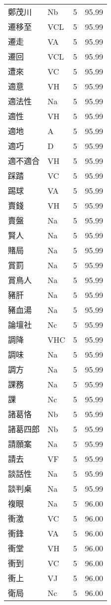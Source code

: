 \documentclass[twocolumn]{book}
\begin{document}
\begin{supertabular}{llrr}
鄭茂川 & Nb & 5 &  95.99\\
遷移至 & VCL & 5 &  95.99\\
遷走 & VA & 5 &  95.99\\
遷回 & VCL & 5 &  95.99\\
遭來 & VC & 5 &  95.99\\
適意 & VH & 5 &  95.99\\
適法性 & Na & 5 &  95.99\\
適性 & VH & 5 &  95.99\\
適地 & A & 5 &  95.99\\
適巧 & D & 5 &  95.99\\
適不適合 & VH & 5 &  95.99\\
踩踏 & VC & 5 &  95.99\\
踢球 & VA & 5 &  95.99\\
賣錢 & VH & 5 &  95.99\\
賣盤 & Na & 5 &  95.99\\
賢人 & Na & 5 &  95.99\\
賭局 & Na & 5 &  95.99\\
賞罰 & Na & 5 &  95.99\\
賞鳥人 & Na & 5 &  95.99\\
豬肝 & Na & 5 &  95.99\\
豬血湯 & Na & 5 &  95.99\\
論壇社 & Nc & 5 &  95.99\\
調降 & VHC & 5 &  95.99\\
調味 & Na & 5 &  95.99\\
調方 & Na & 5 &  95.99\\
課務 & Na & 5 &  95.99\\
課 & Nc & 5 &  95.99\\
諸葛恪 & Nb & 5 &  95.99\\
諸葛四郎 & Nb & 5 &  95.99\\
請願案 & Na & 5 &  95.99\\
請去 & VF & 5 &  95.99\\
談話性 & Na & 5 &  95.99\\
談判桌 & Na & 5 &  95.99\\
複眼 & Na & 5 &  96.00\\
衝激 & VC & 5 &  96.00\\
衝鋒 & VA & 5 &  96.00\\
衝堂 & VH & 5 &  96.00\\
衝到 & VC & 5 &  96.00\\
衝上 & VJ & 5 &  96.00\\
衛局 & Nc & 5 &  96.00\\

\end{supertabular}
\end{document}
